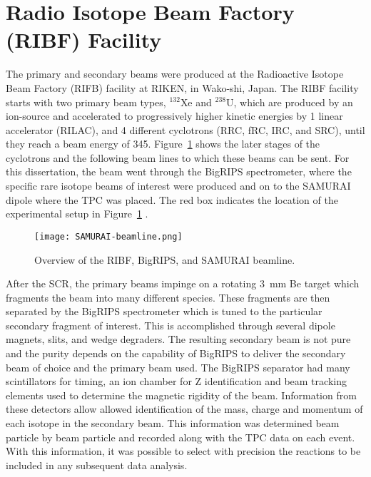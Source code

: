 \section{Radio Isotope Beam Factory (RIBF) Facility }
The primary and secondary beams were produced at the Radioactive Isotope Beam Factory (RIFB) facility at RIKEN, in Wako-shi, Japan. The RIBF facility starts with two primary beam types, ${}^{132}$Xe and ${}^{238}$U, which are produced by an ion-source and accelerated to progressively higher kinetic energies by 1 linear accelerator (RILAC), and 4 different cyclotrons (RRC, fRC, IRC, and SRC), until they reach a beam energy of \SI{345}{\MeVA}. Figure~\ref{fig:samuraiBeamLine} shows the later stages of the cyclotrons and the following beam lines to which these beams can be sent. For this dissertation, the beam went through the BigRIPS spectrometer, where the specific rare isotope beams of interest were produced and on to the SAMURAI dipole where the  \spirit TPC was placed. The red box indicates the location of the experimental setup in Figure~\ref{fig:samuraiBeamLine} .


\begin{figure}[!htb]
\texttt{[image: SAMURAI-beamline.png]}
\caption{Overview of the RIBF, BigRIPS, and SAMURAI beamline.}
\label{fig:samuraiBeamLine}
\end{figure}

After the SCR, the primary beams impinge on a rotating \SI{3}{\milli\metre} Be target which fragments the beam into many different species. These fragments are then separated by the BigRIPS spectrometer which is tuned to the particular secondary fragment of interest. This is accomplished through several dipole magnets, slits, and wedge degraders. The resulting secondary beam is not pure and the purity depends on the capability of BigRIPS to deliver the secondary beam of choice and the primary beam used. The BigRIPS separator had many scintillators for timing, an ion chamber for Z identification and beam tracking elements used to determine the magnetic rigidity of the beam. Information from these detectors allow  allowed  identification  of the mass, charge and momentum of each isotope in the secondary beam. This information was determined beam particle by beam particle and recorded along with the TPC data on each event. With this information, it was possible to select with precision the reactions to be included in any subsequent data analysis.  

